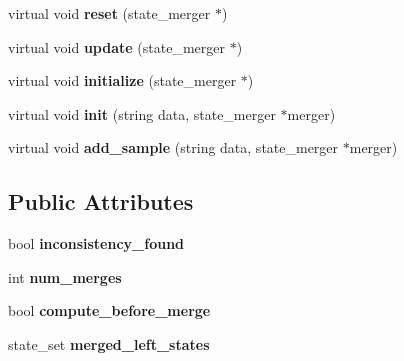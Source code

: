 \begin{DoxyCompactItemize}
\item 
virtual void {\bfseries reset} (state\+\_\+merger $\ast$)\hypertarget{classevaluation__function_acc457754e1aff5d9e20cf51ea8976f37}{}\label{classevaluation__function_acc457754e1aff5d9e20cf51ea8976f37}

\item 
virtual void {\bfseries update} (state\+\_\+merger $\ast$)\hypertarget{classevaluation__function_af2c5134a769ccfd8703608b16a4ede06}{}\label{classevaluation__function_af2c5134a769ccfd8703608b16a4ede06}

\item 
virtual void {\bfseries initialize} (state\+\_\+merger $\ast$)\hypertarget{classevaluation__function_af15dfb9e27651870fbabf8b8355faefc}{}\label{classevaluation__function_af15dfb9e27651870fbabf8b8355faefc}

\item 
virtual void {\bfseries init} (string data, state\+\_\+merger $\ast$merger)\hypertarget{classevaluation__function_aea7c6d5884be03430212d55b3dd546ea}{}\label{classevaluation__function_aea7c6d5884be03430212d55b3dd546ea}

\item 
virtual void {\bfseries add\+\_\+sample} (string data, state\+\_\+merger $\ast$merger)\hypertarget{classevaluation__function_a5b63865df7d337aa0c258b7c795dd6c6}{}\label{classevaluation__function_a5b63865df7d337aa0c258b7c795dd6c6}

\end{DoxyCompactItemize}
\subsection*{Public Attributes}
\begin{DoxyCompactItemize}
\item 
bool {\bfseries inconsistency\+\_\+found}\hypertarget{classevaluation__function_a6631f0e603404c6c08c1a1fdd298932b}{}\label{classevaluation__function_a6631f0e603404c6c08c1a1fdd298932b}

\item 
int {\bfseries num\+\_\+merges}\hypertarget{classevaluation__function_a23fbdcc2f7a07e1d1428e61d5c5c267f}{}\label{classevaluation__function_a23fbdcc2f7a07e1d1428e61d5c5c267f}

\item 
bool {\bfseries compute\+\_\+before\+\_\+merge}\hypertarget{classevaluation__function_a1954a2b161d4da6148e288cb38ac8b59}{}\label{classevaluation__function_a1954a2b161d4da6148e288cb38ac8b59}

\item 
state\+\_\+set {\bfseries merged\+\_\+left\+\_\+states}\hypertarget{classevaluation__function_aff00baf1529b16519900b0f68afe8dad}{}\label{classevaluation__function_aff00baf1529b16519900b0f68afe8dad}

\end{DoxyCompactItemize}
